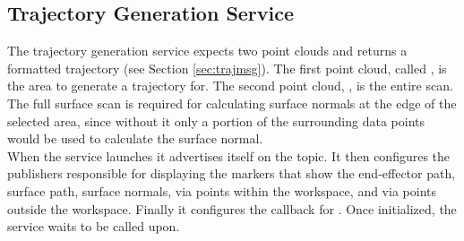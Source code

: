 \subsection{Trajectory Generation  Service}
The trajectory generation service expects two point clouds and returns a  formatted trajectory (see Section \ref{sec:trajmsg}). The first point cloud, called , is the area to generate a trajectory for. The second point cloud, , is the entire scan. The full surface scan is required for calculating surface normals at the edge of the selected area, since without it only a portion of the surrounding data points would be used to calculate the surface normal.\\

When the service launches it advertises itself on the  topic. It then configures the publishers responsible for displaying the markers that show the end-effector path, surface path, surface normals, via points within the workspace, and via points outside the workspace. Finally it configures the callback for . Once initialized, the service waits to be called upon.\\

